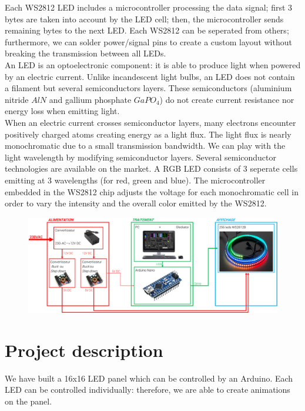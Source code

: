 \documentclass[a4paper,12pt]{article}
\begin{document}
Each WS2812 LED includes a microcontroller processing the data signal; first 3 bytes are taken into account by the LED cell; then, the microcontroller sends remaining bytes to the next LED. Each WS2812 can be seperated from others; furthermore, we can solder power/signal pins to create a custom layout without breaking the transmission between all LEDs.\\

An LED is an optoelectronic component: it is able to produce light when powered by an electric current. Unlike incandescent light bulbs, an LED does not contain a filament but several semiconductors layers. These semiconductors (aluminium nitride $AlN$ and gallium phosphate $GaPO_4$) do not create current resistance nor energy loss when emitting light.\\

When an electric current crosses semiconductor layers, many electrons encounter positively charged atoms creating energy as a light flux. The light flux is nearly monochromatic due to a small transmission bandwidth. We can play with the light wavelength by modifying semiconductor layers. Several semiconductor technologies are available on the market. A RGB LED consists of 3 seperate cells emitting at 3 wavelengths (for red, green and blue). The microcontroller embedded in the WS2812 chip adjusts the voltage for each monochromatic cell in order to vary the intensity and the overall color emitted by the WS2812.
\begin{figure}[htbp]
	\centering
	\includegraphics[width=\textwidth]{img/global}
\end{figure}
\section{Project description}
We have built a 16x16 LED panel which can be controlled by an Arduino. Each LED can be controlled individually: therefore, we are able to create animations on the panel.
\end{document}
